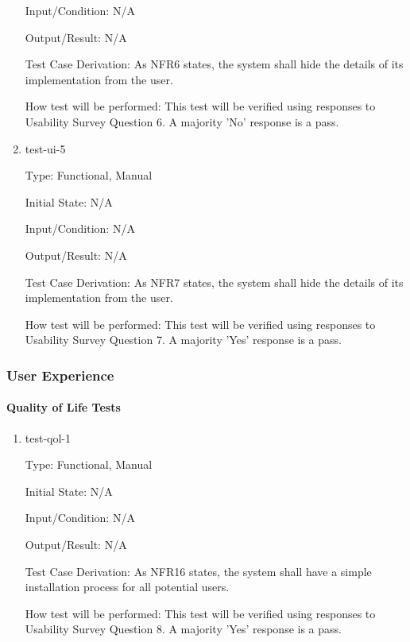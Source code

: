 \documentclass[12pt, titlepage]{article}
\begin{document}
\begin{enumerate}
Input/Condition: N/A

Output/Result: N/A

Test Case Derivation: As NFR6 states, the system shall hide the details of its implementation from the user.

How test will be performed: This test will be verified using responses to Usability Survey Question 6. A majority 'No' response is a pass.

\item{test-ui-5\\}

Type: Functional, Manual

Initial State: N/A

Input/Condition: N/A

Output/Result: N/A

Test Case Derivation: As NFR7 states, the system shall hide the details of its implementation from the user.

How test will be performed: This test will be verified using responses to Usability Survey Question 7. A majority 'Yes' response is a pass.

\end{enumerate}

\subsubsection{User Experience}

\paragraph{Quality of Life Tests}

\begin{enumerate}

\item{test-qol-1\\}

Type: Functional, Manual
					
Initial State: N/A
					
Input/Condition: N/A
					
Output/Result: N/A

Test Case Derivation: As NFR16 states, the system shall have a simple installation process for all potential users.
					
How test will be performed: This test will be verified using responses to Usability Survey Question 8. A majority 'Yes' response is a pass.

\end{enumerate}
\end{document}
